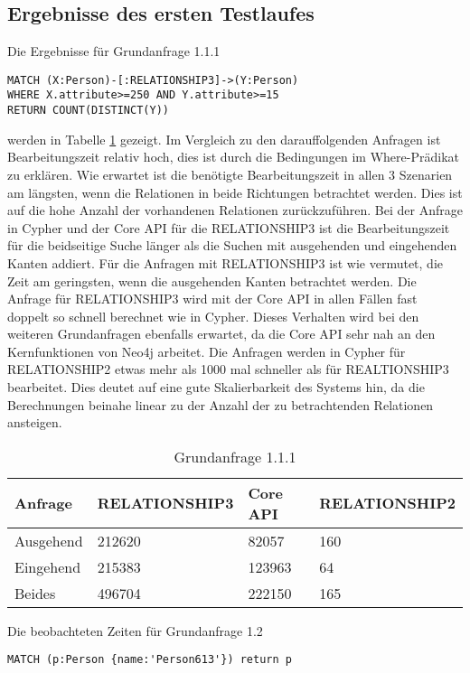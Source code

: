 \subsection{Ergebnisse des ersten Testlaufes}
Die Ergebnisse für Grundanfrage 1.1.1
\begin{Verbatim}[frame=single]
MATCH (X:Person)-[:RELATIONSHIP3]->(Y:Person) 
WHERE X.attribute>=250 AND Y.attribute>=15  
RETURN COUNT(DISTINCT(Y))
\end{Verbatim} 
 werden  in Tabelle \ref{tab:Query1_1} gezeigt. Im Vergleich zu den darauffolgenden Anfragen ist Bearbeitungszeit relativ hoch, dies ist durch die Bedingungen im Where-Prädikat zu erklären. Wie erwartet ist die benötigte Bearbeitungszeit in allen 3 Szenarien am längsten, wenn die Relationen in beide Richtungen betrachtet werden. Dies ist auf die hohe Anzahl der vorhandenen Relationen zurückzuführen. Bei der Anfrage in Cypher und der Core API für die RELATIONSHIP3  ist die Bearbeitungszeit für die beidseitige Suche länger als die Suchen mit ausgehenden und eingehenden Kanten addiert. Für die Anfragen mit RELATIONSHIP3 ist wie vermutet, die Zeit am geringsten, wenn die ausgehenden Kanten betrachtet werden. \newline
Die Anfrage für RELATIONSHIP3 wird mit der Core API in  allen Fällen fast doppelt so schnell berechnet wie in Cypher. Dieses Verhalten wird bei den weiteren Grundanfragen ebenfalls erwartet, da die Core API sehr nah an den Kernfunktionen von Neo4j arbeitet. \newline
Die Anfragen werden in Cypher für RELATIONSHIP2 etwas mehr als 1000 mal schneller als für REALTIONSHIP3 bearbeitet. Dies deutet auf eine gute Skalierbarkeit des Systems hin, da die Berechnungen beinahe linear zu der Anzahl der zu betrachtenden Relationen ansteigen. 
\FloatBarrier  
\begin{table}[h]
\centering
\begin{tabular}{ |p{3cm}||p{3cm}|p{3cm}|p{3cm}|  }
	\hline
	Anfrage& RELATIONSHIP3 &Core API&RELATIONSHIP2\\
	\hline
	Ausgehend	& 212620  & 82057   & 160\\
	Eingehend   & 215383    &123963&  64\\
	Beides&496704 & 222150&  165\\
	\hline
\end{tabular}
\caption{Grundanfrage 1.1.1}
\label{tab:Query1_1}
\end{table}
\FloatBarrier
 \noindent Die beobachteten Zeiten für Grundanfrage 1.2
 \begin{Verbatim}[frame=single]
 MATCH (p:Person {name:'Person613'}) return p
 \end{Verbatim} 
